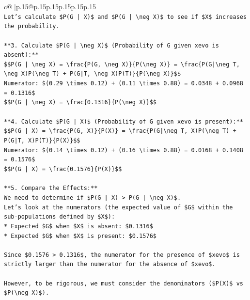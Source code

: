 \documentclass{article}
\begin{document}
{\begin{supertabular}{c@{$\;$}|p{.15\linewidth}@{}p{.15\linewidth}p{.15\linewidth}p{.15\linewidth}p{.15\linewidth}p{.15\linewidth}}
{{{\\ 
\texttt{Let's calculate \$P(G | X)\$ and \$P(G | \textbackslash{}neg X)\$ to see if \$X\$ increases the probability.} \\
\\ 
\texttt{**3. Calculate \$P(G | \textbackslash{}neg X)\$ (Probability of G given xevo is absent):**} \\
\texttt{\$\$P(G | \textbackslash{}neg X) = \textbackslash{}frac\{P(G, \textbackslash{}neg X)\}\{P(\textbackslash{}neg X)\} = \textbackslash{}frac\{P(G|\textbackslash{}neg T, \textbackslash{}neg X)P(\textbackslash{}neg T) + P(G|T, \textbackslash{}neg X)P(T)\}\{P(\textbackslash{}neg X)\}\$\$} \\
\texttt{Numerator: \$(0.29 \textbackslash{}times 0.12) + (0.11 \textbackslash{}times 0.88) = 0.0348 + 0.0968 = 0.1316\$} \\
\texttt{\$\$P(G | \textbackslash{}neg X) = \textbackslash{}frac\{0.1316\}\{P(\textbackslash{}neg X)\}\$\$} \\
\\ 
\texttt{**4. Calculate \$P(G | X)\$ (Probability of G given xevo is present):**} \\
\texttt{\$\$P(G | X) = \textbackslash{}frac\{P(G, X)\}\{P(X)\} = \textbackslash{}frac\{P(G|\textbackslash{}neg T, X)P(\textbackslash{}neg T) + P(G|T, X)P(T)\}\{P(X)\}\$\$} \\
\texttt{Numerator: \$(0.14 \textbackslash{}times 0.12) + (0.16 \textbackslash{}times 0.88) = 0.0168 + 0.1408 = 0.1576\$} \\
\texttt{\$\$P(G | X) = \textbackslash{}frac\{0.1576\}\{P(X)\}\$\$} \\
\\ 
\texttt{**5. Compare the Effects:**} \\
\texttt{We need to determine if \$P(G | X) > P(G | \textbackslash{}neg X)\$.} \\
\texttt{Let's look at the numerators (the expected value of \$G\$ within the sub{-}populations defined by \$X\$):} \\
\texttt{*   Expected \$G\$ when \$X\$ is absent: \$0.1316\$} \\
\texttt{*   Expected \$G\$ when \$X\$ is present: \$0.1576\$} \\
\\ 
\texttt{Since \$0.1576 > 0.1316\$, the numerator for the presence of \$xevo\$ is strictly larger than the numerator for the absence of \$xevo\$.} \\
\\ 
\texttt{However, to be rigorous, we must consider the denominators (\$P(X)\$ vs \$P(\textbackslash{}neg X)\$).} \\
}}}
\end{supertabular}}
\end{document}
